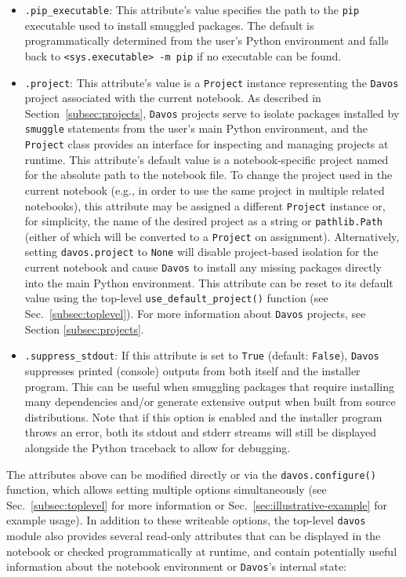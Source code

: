 \documentclass[preprint,12pt,a4paper]{elsarticle}
\begin{document}
\begin{itemize}
\item \texttt{.pip\_executable}: This attribute's value specifies the
  path to the \texttt{pip} executable used to install smuggled
  packages. The default is programmatically determined from the user's Python
  environment and falls back to \texttt{<sys.executable> -m pip} if no
  executable can be found.

\item \texttt{.project}: This attribute's value is a \texttt{Project} instance representing the \texttt{Davos} project associated with the current notebook.
  As described in Section~\ref{subsec:projects}, \texttt{Davos} projects serve to isolate packages installed by \texttt{smuggle} statements from the user's main Python environment, and the \texttt{Project} class provides an interface for inspecting and managing projects at runtime.
  This attribute's default value is a notebook-specific project named for the absolute path to the notebook file.
  To change the project used in the current notebook (e.g., in order to use the same project in multiple related notebooks), this attribute may be assigned a different \texttt{Project} instance or, for simplicity, the name of the desired project as a string or \texttt{pathlib.Path} (either of which will be converted to a \texttt{Project} on assignment).
  Alternatively, setting \texttt{davos.project} to \texttt{None} will disable project-based isolation for the current notebook and cause \texttt{Davos} to install any missing packages directly into the main Python environment.
  This attribute can be reset to its default value using the top-level \texttt{use\_default\_project()} function (see Sec.~\ref{subsec:toplevel}).
  For more information about \texttt{Davos} projects, see Section \ref{subsec:projects}.

\item \texttt{.suppress\_stdout}: If this attribute is set to
  \texttt{True} (default: \texttt{False}), \texttt{Davos} suppresses
  printed (console) outputs from both itself and the installer program.
  This can be useful when smuggling packages that require installing many
  dependencies and/or generate extensive output when built from source
  distributions. Note that if this option is enabled and the installer
  program throws an error, both its stdout and stderr streams will still be
  displayed alongside the Python traceback to allow for debugging.

\end{itemize}

\noindent The attributes above can be modified directly or via the \texttt{davos.configure()} function, which allows setting multiple options simultaneously (see Sec.~\ref{subsec:toplevel} for more information or Sec.~\ref{sec:illustrative-example} for example usage).
In addition to these writeable options, the top-level \texttt{davos} module also provides several read-only attributes that can be displayed in the notebook or checked programmatically at runtime, and contain potentially useful information about the notebook environment or \texttt{Davos}'s internal state:
\end{document}
